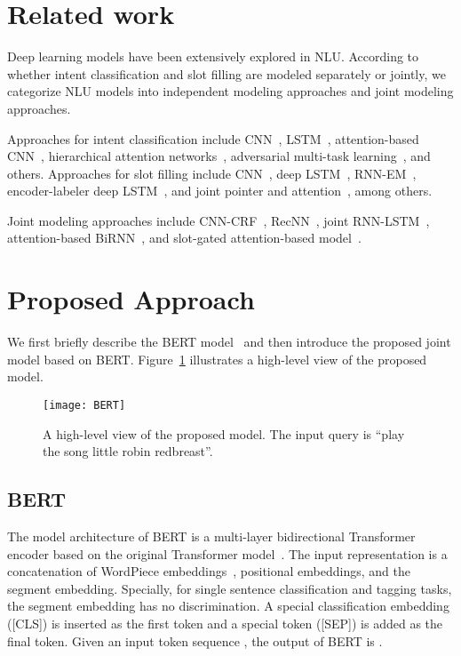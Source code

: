 \documentclass[11pt,a4paper]{article}
\begin{document}
\section{Related work}
Deep learning models have been extensively explored in NLU. According to whether intent classification and slot filling are modeled separately or jointly, we categorize NLU models into independent modeling approaches and joint modeling approaches.

Approaches for intent classification include CNN~\citep{DBLP:conf/emnlp/Kim14,DBLP:conf/nips/ZhangZL15}, LSTM~\citep{DBLP:conf/interspeech/RavuriS15}, attention-based CNN~\citep{DBLP:conf/interspeech/ZhaoW16}, hierarchical attention networks~\citep{DBLP:conf/naacl/YangYDHSH16}, adversarial multi-task learning~\citep{DBLP:conf/acl/LiuQH17}, and others.
Approaches for slot filling include CNN~\citep{DBLP:conf/interspeech/Vu16}, deep LSTM~\citep{DBLP:conf/slt/YaoPZYZS14}, RNN-EM~\citep{DBLP:conf/nlpcc/PengYJW15}, encoder-labeler deep LSTM~\citep{DBLP:journals/corr/KurataXZY16}, and joint pointer and attention~\citep{DBLP:conf/acl/ZhaoF18}, among others.

Joint modeling approaches include CNN-CRF~\citep{DBLP:conf/asru/XuS13}, RecNN~\citep{DBLP:conf/slt/GuoTYZ14}, joint RNN-LSTM~\citep{DBLP:conf/interspeech/Hakkani-TurTCCG16},  attention-based BiRNN~\citep{DBLP:conf/interspeech/LiuL16}, and slot-gated attention-based model~\citep{DBLP:conf/naacl/GooGHHCHC18}. 

\section{Proposed Approach}
We first briefly describe the BERT model~\citep{DBLP:journals/corr/abs-1810-04805} and then introduce the proposed joint model based on BERT. Figure~\ref{fig:bert} illustrates a high-level view of the proposed model.

\begin{figure}[t]
\centering
\texttt{[image: BERT]}
\caption{A high-level view of the proposed model. The input query is ``play the song little robin redbreast''.}
\label{fig:bert}
\end{figure}

\subsection{BERT}

The model architecture of BERT is a multi-layer bidirectional Transformer encoder based on the original Transformer model~\citep{DBLP:conf/nips/VaswaniSPUJGKP17}. 
The input representation is a concatenation of WordPiece embeddings~\citep{DBLP:journals/corr/WuSCLNMKCGMKSJL16}, positional embeddings, and the segment embedding. Specially, for single sentence classification and tagging tasks, the segment embedding has no discrimination. A special classification embedding ([CLS]) is inserted as the first token and a special token ([SEP]) is added as the final token. Given an input token sequence , the output of BERT is .
\end{document}
